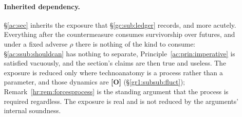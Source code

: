 \documentclass[11pt]{article}
\numberwithin{equation}{section}
\theoremstyle{plain}
\theoremstyle{definition}
\theoremstyle{remark}
\begin{document}
\paragraph{Inherited dependency.} \S\ref{ac:sec} inherits the exposure that \S\ref{gc:sub:ledger} records, and more acutely. Everything after the countermeasure consumes survivorship over futures, and under a fixed adverse $\rho$ there is nothing of the kind to consume: \S\ref{ac:ssub:shouldcan} has nothing to separate, Principle~\ref{ac:prin:imperative} is satisfied vacuously, and the section's claims are then true and useless. The exposure is reduced only where technoanatomy is a process rather than a parameter, and those dynamics are \textbf{[O]} (\S\ref{gr1:subsub:fluct}); Remark~\ref{hr:rem:forcesprocess} is the standing argument that the process is required regardless. The exposure is real and is not reduced by the arguments' internal soundness.

%
%
%

\end{document}
